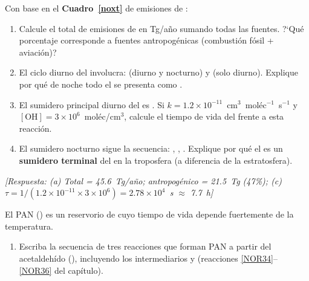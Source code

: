 \begin{bloque_ejercicios}
\begin{ejercicios}
\item Con base en el \textbf{Cuadro~\ref{noxt}} de emisiones de :

\begin{enumerate}[label=\alph*)]
    \item Calcule el total de emisiones de  en
          \si{\tera\gram}/a\~no sumando todas las fuentes.
          ?`Qu\'e porcentaje corresponde a fuentes antropog\'enicas
          (combusti\'on f\'osil + aviaci\'on)?

    \item El ciclo diurno del  involucra:
           (diurno y nocturno) y
           (solo diurno).
          Explique por qu\'e de noche todo el 
          se presenta como .

    \item El sumidero principal diurno del  es
          .
          Si $k = 1.2\times10^{-11}$~cm$^3$~mol\'ec$^{-1}$~s$^{-1}$
          y $[\mathrm{OH}] = 3\times10^6$~mol\'ec/cm$^3$,
          calcule el tiempo de vida del  frente
          a esta reacci\'on.

    \item El sumidero nocturno sigue la secuencia:
          ,
          ,
          .
          Explique por qu\'e el  es un
          \textbf{sumidero terminal} del  en
          la troposfera (a diferencia de la estratosfera).
\end{enumerate}

\textit{[Respuesta:
(a) Total = 45.6~Tg/a\~no; antropog\'enico = 21.5~Tg
    (47\%);
(c) $\tau = 1/(1.2\times10^{-11}\times3\times10^6)
    = 2.78\times10^4$~s $\approx$ 7.7~h]}

\item El PAN () es un reservorio de 
cuyo tiempo de vida depende fuertemente de la temperatura.

\begin{enumerate}[label=\alph*)]
    \item Escriba la secuencia de tres reacciones que forman PAN
          a partir del acetaldeh\'ido (), incluyendo
          los intermediarios  y 
          (reacciones \ref{NOR34}--\ref{NOR36} del cap\'itulo).


\end{enumerate}
\end{ejercicios}
\end{bloque_ejercicios}
